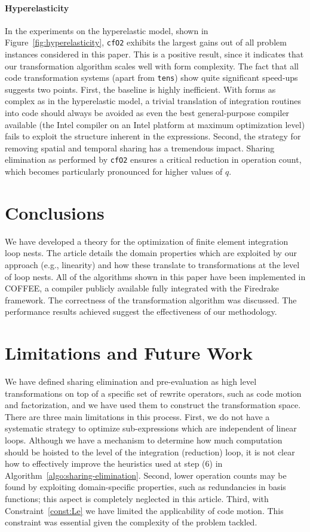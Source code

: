 \paragraph{Hyperelasticity}
In the experiments on the hyperelastic model, shown in Figure~\ref{fig:hyperelasticity}, \texttt{cfO2} exhibits the largest gains out of all problem instances considered in this paper. This is a positive result, since it indicates that our transformation algorithm scales well with form complexity. The fact that all code transformation systems (apart from \texttt{tens}) show quite significant speed-ups suggests two points. First, the baseline is highly inefficient. With forms as complex as in the hyperelastic model, a trivial translation of integration routines into code should always be avoided as even the best general-purpose compiler available (the Intel compiler on an Intel platform at maximum optimization level) fails to exploit the structure inherent in the expressions. Second, the strategy for removing spatial and temporal sharing has a tremendous impact. Sharing elimination as performed by \texttt{cfO2} ensures a critical reduction in operation count, which becomes particularly pronounced for higher values of $q$. 

\section{Conclusions}
\label{sec:conclusions}
We have developed a theory for the optimization of finite element integration loop nests. The article details the domain properties which are exploited by our approach (e.g., linearity) and how these translate to transformations at the level of loop nests. All of the algorithms shown in this paper have been implemented in COFFEE, a compiler publicly available fully integrated with the Firedrake framework. The correctness of the transformation algorithm was discussed. The performance results achieved suggest the effectiveness of our methodology. 

\section{Limitations and Future Work}
\label{sec:completeness}
We have defined sharing elimination and pre-evaluation as high level transformations on top of a specific set of rewrite operators, such as code motion and factorization, and we have used them to construct the transformation space. There are three main limitations in this process. First, we do not have a systematic strategy to optimize sub-expressions which are independent of linear loops. Although we have a mechanism to determine how much computation should be hoisted to the level of the integration (reduction) loop, it is not clear how to effectively improve the heuristics used at step (6) in Algorithm~\ref{algo:sharing-elimination}. Second, lower operation counts may be found by exploiting domain-specific properties, such as redundancies in basis functions; this aspect is completely neglected in this article. Third, with Constraint~\ref{const:Le} we have limited the applicability of code motion. This constraint was essential given the complexity of the problem tackled. 

